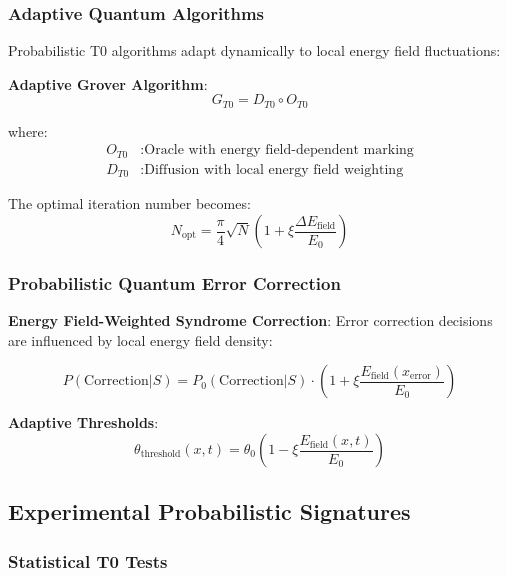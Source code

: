 \documentclass[12pt,a4paper]{article}
\newcommand{\xipar}{\xi}
\theoremstyle{definition}
\theoremstyle{remark}
\begin{document}
\subsubsection{Adaptive Quantum Algorithms}

Probabilistic T0 algorithms adapt dynamically to local energy field fluctuations:

\textbf{Adaptive Grover Algorithm}:
\begin{equation}
	G_{T0} = D_{T0} \circ O_{T0}
\end{equation}

where:
\begin{align}
	O_{T0} &: \text{Oracle with energy field-dependent marking} \\
	D_{T0} &: \text{Diffusion with local energy field weighting}
\end{align}

The optimal iteration number becomes:
\begin{equation}
	N_{\text{opt}} = \frac{\pi}{4} \sqrt{N} \left(1 + \xipar \frac{\Delta E_{\text{field}}}{E_0}\right)
	\label{eq:adaptive_grover_iterations_en}
\end{equation}

\subsubsection{Probabilistic Quantum Error Correction}

\textbf{Energy Field-Weighted Syndrome Correction}:
Error correction decisions are influenced by local energy field density:

\begin{equation}
	P(\text{Correction}|S) = P_0(\text{Correction}|S) \cdot \left(1 + \xipar \frac{E_{\text{field}}(x_{\text{error}})}{E_0}\right)
	\label{eq:weighted_error_correction_en}
\end{equation}

\textbf{Adaptive Thresholds}:
\begin{equation}
	\theta_{\text{threshold}}(x,t) = \theta_0 \left(1 - \xipar \frac{E_{\text{field}}(x,t)}{E_0}\right)
	\label{eq:adaptive_threshold_en}
\end{equation}

\subsection{Experimental Probabilistic Signatures}

\subsubsection{Statistical T0 Tests}
\end{document}
